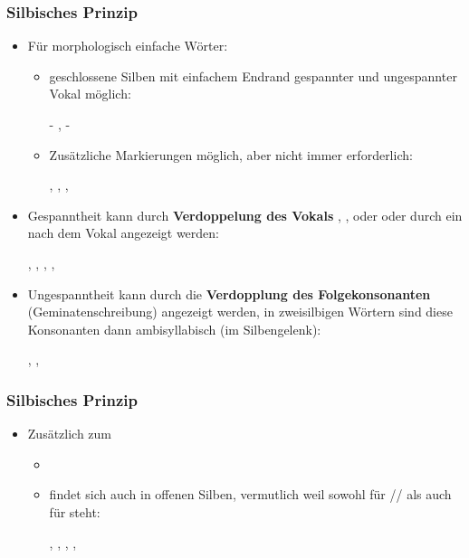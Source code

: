 \begin{frame}
\frametitle{Silbisches Prinzip}

\begin{itemize}
	\item Für morphologisch einfache Wörter:
	
	\begin{itemize}
		\item geschlossene Silben mit einfachem Endrand \ras gespannter und ungespannter Vokal möglich:
		
		  \ea
                   - ,  - 
                  \z
		
		\item Zusätzliche Markierungen möglich, aber nicht immer erforderlich: 
		
		  \ea
                  , , , 
                  \z
		
	\end{itemize}
		
		\item Gespanntheit kann durch \textbf{Verdoppelung des Vokals} , ,  oder  oder durch ein  nach dem Vokal angezeigt werden: 
			
		  \ea
                  , , , , 
                  \z
		
		\item Ungespanntheit kann durch die \textbf{Verdopplung des Folgekonsonanten} (Geminatenschreibung) angezeigt werden, in zweisilbigen Wörtern sind diese Konsonanten dann ambisyllabisch (im Silbengelenk): 
		
		  \ea
                  , , 
                  \z
		
\end{itemize}


\end{frame}


\begin{frame}
\frametitle{Silbisches Prinzip}

\begin{itemize}
	\item Zusätzlich zum 
	
	\begin{itemize}
		\item[]
		\item {} findet sich auch in offenen Silben, vermutlich weil  sowohl für /\textschwa{}/ als auch für  steht:
		
		  \ea
                  , , ,
                  , 
                  \z
		
	\end{itemize}
\end{itemize}


\end{frame}



